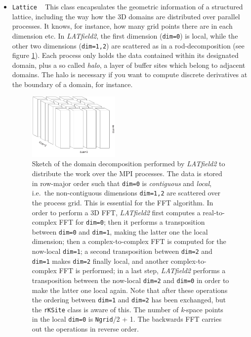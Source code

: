 \documentclass[a4paper,10pt]{article}
\begin{document}
\begin{itemize}
 \item[] \hspace{-25pt}\texttt{Lattice} ~ This class encapsulates the geometric information of a structured lattice, including the way how
 the 3D domains are distributed over parallel processes. It knows, for instance, how many grid points there are in each dimension etc. In
 \textit{LATfield2}, the first dimension (\texttt{dim=0}) is local, while the other two dimensions (\texttt{dim=1,2}) are scattered as in a
 rod-decomposition (see figure \ref{fig:latfield}). Each process only holds the data contained within its designated domain, plus a so
 called \textit{halo}, a layer of buffer sites which belong to adjacent domains. The halo is necessary if you want to compute discrete
 derivatives at the boundary of a domain, for instance.
 
\begin{figure}
\label{fig:latfield}
 \includegraphics[width=0.42\textwidth]{latfield}
 \caption{\small Sketch of the domain decomposition performed by \textit{LATfield2} to distribute the work over the MPI processes. The data
 is stored in row-major order such that \texttt{dim=0} is \textit{contiguous} and \textit{local}, i.e.\ the non-contiguous dimensions
 \texttt{dim=1,2} are scattered over the process grid. This is essential for the FFT algorithm. In order to perform a 3D FFT,
 \textit{LATfield2} first computes a real-to-complex FFT for \texttt{dim=0}; then it performs a transposition between \texttt{dim=0} and
 \texttt{dim=1}, making the latter one the local dimension; then a complex-to-complex FFT is computed for the now-local \texttt{dim=1}; a
 second transposition between \texttt{dim=2} and \texttt{dim=1} makes \texttt{dim=2} finally local, and another complex-to-complex FFT is
 performed; in a last step, \textit{LATfield2} performs a transposition between the now-local \texttt{dim=2} and \texttt{dim=0} in order to
 make the latter one local again. Note that after these operations the 
ordering between \texttt{dim=1} and \texttt{dim=2} has been exchanged, but the \texttt{rKSite} class is aware of this. The number of \textit{k}-space points in the local \texttt{dim=0} is \texttt{Ngrid}/2 + 1. The backwards FFT carries out the operations in reverse order.}
\end{figure}
 

\end{itemize}
\end{document}
